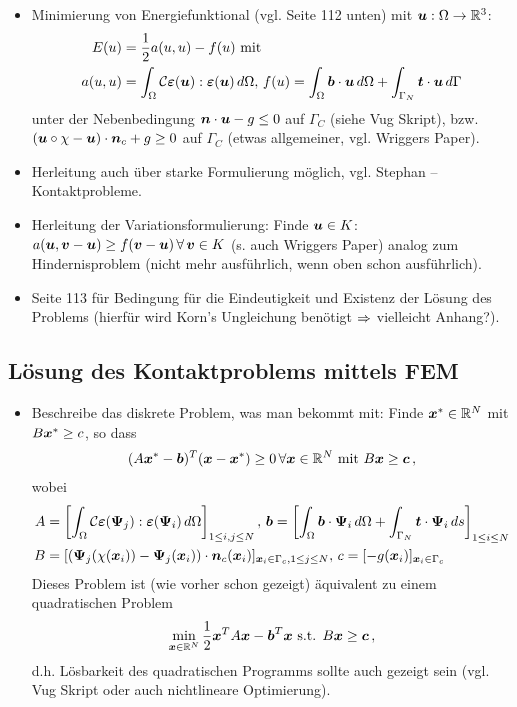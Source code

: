 \begin{itemize}
\item Minimierung von Energiefunktional (vgl. \cite{KikOden} Seite 112 unten) mit $\boldsymbol{u}: \Omega\rightarrow \mathbb{R}^3$:
\begin{align*}
	E(u)& = \frac 1 2 a(u,u)-f(u) \text{ mit } \\
	 a(u,u) &= \int_\Omega {\mathcal C} \boldsymbol{\varepsilon} (\boldsymbol u): \boldsymbol{\varepsilon}(\boldsymbol u) \, d\Omega , \, f(u) = \int_\Omega \boldsymbol b \cdot \boldsymbol u \, d\Omega + \int_{\Gamma_N} \boldsymbol t \cdot \boldsymbol u \, d\Gamma
\end{align*}
unter der Nebenbedingung $\boldsymbol n \cdot \boldsymbol u - g \le 0$ auf $\Gamma_C$  (siehe Vug Skript), bzw. $(\boldsymbol u\circ \chi - \boldsymbol u)\cdot \boldsymbol n_c + g \ge 0$ auf $\Gamma_C$ (etwas allgemeiner, vgl. Wriggers Paper).
\item Herleitung auch über starke Formulierung möglich, vgl. Stephan – Kontaktprobleme.
\item Herleitung der Variationsformulierung: Finde $\boldsymbol u \in K$: $a(\boldsymbol u,\boldsymbol v-\boldsymbol u) \ge f(\boldsymbol v-\boldsymbol u) \, \forall \, \boldsymbol v \in K$ (s. auch Wriggers Paper) analog zum Hindernisproblem (nicht mehr ausführlich, wenn oben schon ausführlich).
\item \cite{KikOden} Seite 113 für Bedingung für die Eindeutigkeit und Existenz der Lösung des Problems (hierfür wird Korn's Ungleichung benötigt $\Rightarrow$ vielleicht Anhang?).
\end{itemize}

\subsection{Lösung des Kontaktproblems mittels FEM}

\begin{itemize}
\item Beschreibe das diskrete Problem, was man bekommt mit: Finde $\boldsymbol x^* \in \mathbb{R}^N$ mit $B\boldsymbol x^* \ge c$, so dass
\begin{align*}
	(A\boldsymbol x^* - \boldsymbol b)^T (\boldsymbol x - \boldsymbol x^*) \ge 0 \, \forall \boldsymbol x\in \mathbb{R}^N \text{ mit } B\boldsymbol x \ge \boldsymbol c \, ,
\end{align*}
wobei
\begin{align*}
A &= \left[\int_\Omega \mathcal C \boldsymbol {\varepsilon} (\boldsymbol \Psi_j):\boldsymbol {\varepsilon}(\boldsymbol \Psi_i) \, d\Omega\right]_{1 \le i,j\le N} , \,  \boldsymbol b = \left[ \int_\Omega \boldsymbol b \cdot \boldsymbol\Psi_i \, d\Omega + \int_{\Gamma_N} \boldsymbol t \cdot \boldsymbol\Psi_i \, ds\right]_{1\le i \le N} \\
B & = [(\boldsymbol \Psi_j(\chi(\boldsymbol x_i))-\boldsymbol \Psi_j(\boldsymbol x_i))\cdot \boldsymbol n_c(\boldsymbol x_i)]_{\boldsymbol x_i \in \Gamma_c, 1\le j \le N} , \, c = [-g(\boldsymbol x_i)]_{\boldsymbol x_i \in \Gamma_c}
\end{align*}
Dieses Problem ist (wie vorher schon gezeigt) äquivalent zu einem quadratischen Problem
\begin{align*}
\min_{\boldsymbol x\in \mathbb{R}^N} \frac 1 2 \boldsymbol x^T A \boldsymbol x - \boldsymbol b^T \boldsymbol x \text{ s.t. } B\boldsymbol x \ge \boldsymbol c \, ,
\end{align*}
d.h. Lösbarkeit des quadratischen Programms sollte auch gezeigt sein (vgl. Vug Skript oder auch nichtlineare Optimierung).
\end{itemize}


\newpage

